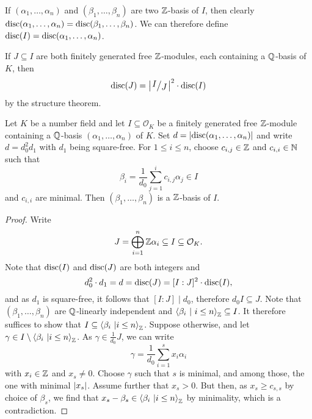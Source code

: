 \begin{opomba}
If $(\alpha_1, \dots, \alpha_n)$ and $(\beta_1, \dots, \beta_n)$
are two $\mathbb{Z}$-basis of $I$, then clearly
$\operatorname{disc}(\alpha_1, \dots, \alpha_n) =
\operatorname{disc}(\beta_1, \dots, \beta_n)$. We can therefore define
$\operatorname{disc}(I) = \operatorname{disc}(\alpha_1, \dots, \alpha_n)$.
\end{opomba}

\begin{opomba}
If $J \subseteq I$ are both finitely generated free $\mathbb{Z}$-modules,
each containing a $\mathbb{Q}$-basis of $K$, then
\[
\disc(J) = \abs{\kvoc{I}{J}}^2 \cdot \disc(I)
\]
by the structure theorem.
\end{opomba}

\begin{izrek}
Let $K$ be a number field and let $I \subseteq \mathcal{O}_K$ be a
finitely generated free $\mathbb{Z}$-module containing a $\mathbb{Q}$-basis
$(\alpha_1, \dots, \alpha_n)$ of $K$. Set
$d = \left\lvert \operatorname{disc}(\alpha_1, \dots, \alpha_n)\right\rvert$ and write
$d = d_0^2 d_1$ with $d_1$ being square-free. For
$1 \leq i \leq n$, choose $c_{i,j} \in \mathbb{Z}$ and $c_{i,i} \in \mathbb{N}$
such that
\[
\beta_i = \frac{1}{d_0} \sum_{j=1}^i c_{i,j} \alpha_j \in I
\]
and $c_{i,i}$ are minimal. Then $(\beta_1, \dots, \beta_n)$ is a
$\mathbb{Z}$-basis of $I$.
\end{izrek}


\begin{proof}
Write
\[
J = \bigoplus_{i=1}^n \mathbb{Z} \alpha_i \subseteq
I \subseteq
\mathcal{O}_K.
\]
Note that $\operatorname{disc}(I)$ and $\operatorname{disc}(J)$ are both integers and
\[
d_0^2 \cdot d_1 = d = \operatorname{disc}(J) = [I : J]^2 \cdot \operatorname{disc}(I),
\]
and as $d_1$ is square-free, it follows that $[I : J] \mid d_0$,
therefore $d_0 I \subseteq J$. Note that
$(\beta_1, \dots, \beta_n)$ are $\mathbb{Q}$-linearly independent and
$\left\langle \beta_i~\middle\vert~i \leq n\right\rangle_{\mathbb{Z}} \subseteq I$. It therefore
suffices to show that
$I \subseteq \left\langle \beta_i~\middle\vert i \leq n\right\rangle_{\mathbb{Z}}$. Suppose
otherwise, and let
$\gamma \in I \setminus \left\langle \beta_i~\middle\vert i \leq n\right\rangle_{\mathbb{Z}}$. As
$\gamma \in \frac{1}{d_0} J$, we can write
\[
\gamma = \frac{1}{d_0} \sum_{i=1}^s x_i \alpha_i
\]
with $x_i \in \mathbb{Z}$ and $x_s \ne 0$. Choose $\gamma$ such that $s$ is
minimal, and among those, the one with minimal $\left\lvert x_s\right\rvert$. Assume
further that $x_s > 0$. But then, as $x_s \geq c_{s,s}$ by choice
of $\beta_s$, we find that
$x_s - \beta_s \in \left\langle \beta_i~\middle\vert i \leq n\right\rangle_{\mathbb{Z}}$ by
minimality, which is a contradiction.
\end{proof}

